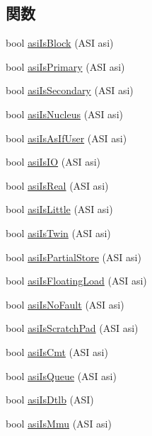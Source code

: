 \subsection*{関数}
\begin{DoxyCompactItemize}
\item 
bool \hyperlink{namespaceSparcISA_a51a8c3cd909314c647c40ff58e2fa175}{asiIsBlock} (ASI asi)
\item 
bool \hyperlink{namespaceSparcISA_ac7434308e8dc3fc6c7dae78c6ac710b3}{asiIsPrimary} (ASI asi)
\item 
bool \hyperlink{namespaceSparcISA_adc1ad600b03009207cc4337448c950a6}{asiIsSecondary} (ASI asi)
\item 
bool \hyperlink{namespaceSparcISA_adb17635c66d11c5c6423bb77af7c481b}{asiIsNucleus} (ASI asi)
\item 
bool \hyperlink{namespaceSparcISA_a4e89e6ead9db1ab06ded3dc574747942}{asiIsAsIfUser} (ASI asi)
\item 
bool \hyperlink{namespaceSparcISA_a7d3651e32d579ad43f28a95d968e8e12}{asiIsIO} (ASI asi)
\item 
bool \hyperlink{namespaceSparcISA_a90ff92b6c0cfc52e5c210526eb5753d4}{asiIsReal} (ASI asi)
\item 
bool \hyperlink{namespaceSparcISA_a2376d99d5b5a3ebe74c0d4b7585929c2}{asiIsLittle} (ASI asi)
\item 
bool \hyperlink{namespaceSparcISA_af6b0e385f0a748a47752cb8fd823d8fb}{asiIsTwin} (ASI asi)
\item 
bool \hyperlink{namespaceSparcISA_aa17d361a7b759ca0415a9c85b4e77b56}{asiIsPartialStore} (ASI asi)
\item 
bool \hyperlink{namespaceSparcISA_af92b25736f3e2514bafd863b96b2a407}{asiIsFloatingLoad} (ASI asi)
\item 
bool \hyperlink{namespaceSparcISA_a0bfa477f1265e8c4f862c16cd6ff54e5}{asiIsNoFault} (ASI asi)
\item 
bool \hyperlink{namespaceSparcISA_adee3e63d7c8a89574a10d0da306c1be1}{asiIsScratchPad} (ASI asi)
\item 
bool \hyperlink{namespaceSparcISA_a9531fb3db93ff00372571a055d094ddc}{asiIsCmt} (ASI asi)
\item 
bool \hyperlink{namespaceSparcISA_a5360b39b7131894da3d9678add217ad9}{asiIsQueue} (ASI asi)
\item 
bool \hyperlink{namespaceSparcISA_aa61b381f75bd65d8c8599a40c59c828a}{asiIsDtlb} (ASI)
\item 
bool \hyperlink{namespaceSparcISA_a89468421f86725b3dabc030976d7d66a}{asiIsMmu} (ASI asi)

\end{DoxyCompactItemize}
